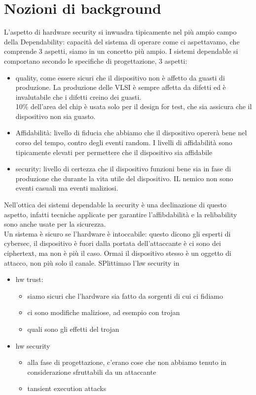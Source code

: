 \documentclass[oneside, 12pt]{extbook}
\begin{document}
\section{Nozioni di background}
L'aspetto di hardware security si inwuadra tipicamente nel più ampio campo della Dependability: capacità del sistema di operare come ci aspettavamo, che comprende 3 aspetti, siamo in un concetto più ampio. I sistemi dependable si comportano secondo le specifiche di progettazione, 3 aspetti:
\begin{itemize}
	\item quality, come essere sicuri che il dispositivo non è affetto da guasti di produzione. La produzione delle VLSI è sempre affetta da difetti ed è invalutabile che i difetti creino dei guasti.\\10\% dell'area del chip è usata solo per il design for test, che sia assicura che il dispositivo non sia guasto.
	\item Affidabilità: livello di fiducia che abbiamo che il dispositivo opererà bene nel corso del tempo, contro degli eventi random. I livelli di affidabilità sono tipicamente elevati per permettere che il dispositivo sia affidabile
	\item security: livello di certezza che il dispositivo funzioni bene sia in fase di produzione che durante la vita utile del dispositivo. IL nemico non sono eventi casuali ma eventi maliziosi.
\end{itemize}
Nell'ottica dei sistemi dependable la security è una declinazione di questo aspetto, infatti tecniche applicate per garantire l'affibdabilità e la relibability sono anche usate per la sicurezza.\\Un sistema è sicuro se l'hardware è intoccabile: questo dicono gli esperti di cybersec, il dispositivo è fuori dalla portata dell'attaccante è ci sono dei ciphertext, ma non è più il caso. Ormai il dispositivo stesso è un oggetto di attacco, non più solo il canale. SPlittimao l'hw security in
\begin{itemize}
	\item hw trust:
	\begin{itemize}
		\item siamo sicuri che l'hardware sia fatto da sorgenti di cui ci fidiamo
		\item ci sono modifiche maliziose, ad esempio con trojan
		\item quali sono gli effetti del trojan
	\end{itemize}
	\item hw security
	\begin{itemize}
		\item alla fase di progettazione, c'erano cose che non abbiamo tenuto in considerazione sfruttabili da un attaccante
		\item tansient execution attacks
	\end{itemize}
\end{itemize}
\end{document}
